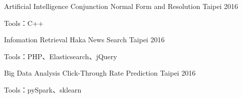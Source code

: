 
\begin{cventries}

  \cventry
    {Artificial Intelligence}
    {Conjunction Normal Form and Resolution}
    {Taipei} %
    {2016} %
    {
      \begin{cvitems} %
        \item {Tools：C++}
      \end{cvitems}
    }


  \cventry
    {Infomation Retrieval}
    {Haka News Search}
    {Taipei} %
    {2016} %
    {
      \begin{cvitems} %
        \item {Tools：PHP、Elasticsearch、jQuery}
      \end{cvitems}
    }


  \cventry
    {Big Data Analysis}
    {Click-Through Rate Prediction}
    {Taipei} %
    {2016} %
    {
      \begin{cvitems} %
        \item {Tools：pySpark、sklearn}
      \end{cvitems}
    }

\end{cventries}
